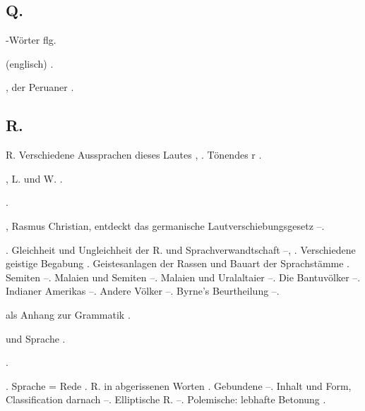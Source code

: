 \begin{register}
\subsection*{Q.}\label{reg.Q}

-Wörter \pageref{sp.466} flg.


 (englisch) \pageref{sp.230}.

,  der Peruaner \pageref{sp.128}.

\subsection*{R.}\label{reg.R}

R. Verschiedene Aussprachen dieses Lautes \pageref{sp.36}, \pageref{sp.37}. Tönendes r \pageref{sp.186}.

, L. und W. \pageref{sp.69}.

 \pageref{sp.147}.

, Rasmus Christian, entdeckt das germanische Lautverschiebungsgesetz \pageref{sp.26}–\pageref{sp.27}.

. Gleichheit und Ungleichheit der R. und Sprachverwandtschaft \pageref{sp.147}–\pageref{sp.148}, \pageref{sp.178}. Verschiedene geistige Begabung \pageref{sp.395}. Geistesanlagen der Rassen und Bauart der Sprachstämme \pageref{sp.407}. Semiten \pageref{sp.408}–\pageref{sp.411}. Malaien und Semiten \pageref{sp.411}–\pageref{sp.415}. Malaien und Uralaltaier \pageref{sp.415}–\pageref{sp.420}. Die Bantuvölker \pageref{sp.420}–\pageref{sp.423}. Indianer Amerikas \pageref{sp.423}–\pageref{sp.425}. Andere Völker \pageref{sp.425}–\pageref{sp.426}. Byrne’s Beurtheilung \pageref{sp.426}–\pageref{sp.427}.

 als Anhang zur Grammatik \pageref{sp.107}.

 und Sprache \pageref{sp.17}.

 \pageref{sp.102}.


. Sprache = Rede \pageref{sp.3}\sed{, \pageref{sp.59}}. R. in abgerissenen Worten \pageref{sp.182}. Gebundene \pageref{sp.225}–\pageref{sp.227}. Inhalt und Form, Classification darnach \pageref{sp.317}–\pageref{sp.324}. Elliptische R. \pageref{sp.367}–\pageref{sp.368}. Polemische: lebhafte Betonung \pageref{sp.374}.


\end{register}
